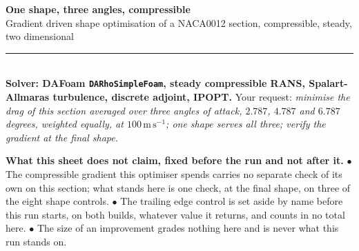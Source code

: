 \documentclass[9pt,a4paper]{article}
\renewcommand{\footnotesize}{\fontsize{6.4}{6.85}\selectfont}
\begin{document}
\fontsize{7.3}{8.0}\selectfont

{\fontsize{13.5}{15}\selectfont\bfseries One shape, three angles, compressible}\\[1.5pt]
{\fontsize{8.6}{10}\selectfont Gradient driven shape optimisation of a
NACA0012 section, compressible, steady, two dimensional}\\[2pt]
{\color{rulegrey}\rule{\textwidth}{0.9pt}}\\[1pt]
{\footnotesize \textbf{Solver: DAFoam \texttt{DARhoSimpleFoam}, steady
compressible RANS, Spalart-Allmaras turbulence, discrete adjoint, IPOPT.}
Your request: \emph{minimise the drag of this section averaged over three
angles of attack, $2.787$, $4.787$ and $6.787$ degrees, weighted equally, at
$100\,\mathrm{m\,s^{-1}}$; one shape serves all three; verify the gradient at
the final shape.}}

\vspace{1.5pt}
\colorbox{limitgrey}{\begin{minipage}{0.985\textwidth}
\vspace{1pt}
{\footnotesize\textbf{What this sheet does not claim, fixed before the run and
not after it.}
$\bullet$ The compressible gradient this optimiser spends carries no separate
check of its own on this section; what stands here is one check, at the final
shape, on three of the eight shape controls.
$\bullet$ The trailing edge control is set aside by name before this run
starts, on both builds, whatever value it returns, and counts in no total here.
$\bullet$ The size of an improvement grades nothing here and is never what
this run stands on.}
\vspace{1pt}
\end{minipage}}
\end{document}
